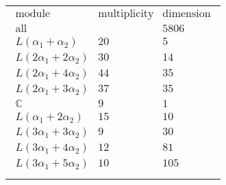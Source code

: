 \documentclass[crop,border=2mm]{standalone}
\begin{document}
\begin{tabular}{l}
$\displaystyle
\begin{array}{rll}
	\text{module}&\text{multiplicity}&\text{dimension} \\ \hline \text{all}&&5806 \\
	L\left(\alpha_{1}+\alpha_{2}\right)&20&5\\
	L\left( 2\alpha_{1}+ 2\alpha_{2}\right)&30&14\\
	L\left( 2\alpha_{1}+ 4\alpha_{2}\right)&44&35\\
	L\left( 2\alpha_{1}+ 3\alpha_{2}\right)&37&35\\
	\mathbb{C}&9&1\\
	L\left(\alpha_{1}+ 2\alpha_{2}\right)&15&10\\
	L\left( 3\alpha_{1}+ 3\alpha_{2}\right)&9&30\\
	L\left( 3\alpha_{1}+ 4\alpha_{2}\right)&12&81\\
	L\left( 3\alpha_{1}+ 5\alpha_{2}\right)&10&105
\end{array}
$ \\ \\

\end{tabular}
\end{document}
